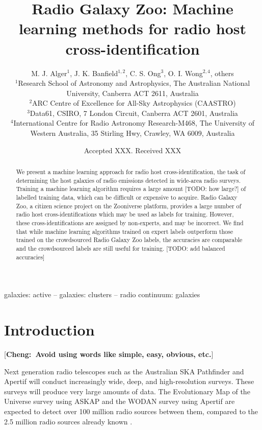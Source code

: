 \documentclass[fleqn,usenatbib,usedcolumn]{mnras}
\title[ML CDFS]{Radio Galaxy Zoo: Machine learning methods for radio host cross-identification}
\author[RGZ ML Team]{M. J. Alger$^{1}$, J. K. Banfield$^{1, 2}$, C. S. Ong$^{3}$, O. I. Wong$^{2, 4}$, others
\\
$^{1}$Research School of Astronomy and Astrophysics, The Australian National University, Canberra ACT 2611, Australia\\
$^{2}$ARC Centre of Excellence for All-Sky Astrophysics (CAASTRO)\\
$^{3}$Data61, CSIRO, 7 London Circuit, Canberra ACT 2601, Australia\\
$^{4}$International Centre for Radio Astronomy Research-M468, The University of Western Australia, 35 Stirling Hwy, Crawley, WA 6009, Australia
}
\date{Accepted XXX. Received XXX}
\newcommand{\cheng}[1]{ {\color{teal}[{\bf Cheng:~{#1}}]} }
\begin{document}
\label{firstpage}
\pagerange{\pageref{firstpage}--\pageref{lastpage}}
\maketitle

\begin{abstract}
  We present a machine learning approach for radio host cross-identification,
  the task of determining the host galaxies of radio emissions detected in
  wide-area radio surveys. Training a machine learning algorithm requires a
  large amount [TODO: how large?] of labelled training data, which can be
  difficult or expensive to acquire. Radio Galaxy Zoo, a citizen science
  project on the Zooniverse platform, provides a large number of radio host
  cross-identifications which may be used as labels for training. However,
  these cross-identifications are assigned by non-experts, and may be
  incorrect. We find that while machine learning algorithms trained on expert
  labels outperform those trained on the crowdsourced Radio Galaxy Zoo labels,
  the accuracies are comparable and the crowdsourced labels are still useful
  for training. [TODO: add balanced accuracies]
\end{abstract}

\begin{keywords}
galaxies: active -- galaxies: clusters -- radio continuum: galaxies
\end{keywords}


\section{Introduction}\label{introduction}

  \cheng{Avoid using words like simple, easy, obvious, etc.}

  Next generation radio telescopes such as the Australian SKA Pathfinder
  \citep[ASKAP;][]{johnston07} and Apertif \citep{verheijen08} will
  conduct increasingly wide, deep, and high-resolution surveys. These
  surveys will produce very large amounts of data. The Evolutionary Map of
  the Universe survey \citep[EMU;][]{norris11} using ASKAP and the WODAN
  survey \citep{rottgering11} using Apertif are expected to detect
  over 100 million radio sources between them, compared to the 2.5 million
  radio sources already known \citep{banfield15}.
\end{document}
